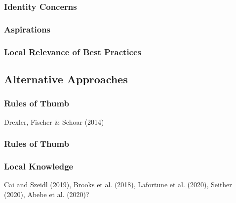 \documentclass[hideothersubsections, usenames,dvipsnames,10pt]{beamer}
\newenvironment{itemize_3pt}{\itemize\addtolength{\itemsep}{3pt}}{\enditemize}
\begin{document}
\begin{frame}
\frametitle{Identity Concerns}
	\begin{itemize_3pt}
	\item 
	\vspace{0.1in}
	\end{itemize_3pt}
\end{frame}

\begin{frame}
\frametitle{Aspirations}
	\begin{itemize_3pt}
	\item 
	\vspace{0.1in}
	\end{itemize_3pt}
\end{frame}

\begin{frame}
\frametitle{Local Relevance of Best Practices}
	\begin{itemize_3pt}
	\item 
	\vspace{0.1in}
	\end{itemize_3pt}
\end{frame}


\subsection{Alternative Approaches}

\begin{frame}
\frametitle{Rules of Thumb}
	\begin{itemize_3pt}
	\item Drexler, Fischer \& Schoar (2014)
	\vspace{0.1in}
	\end{itemize_3pt}
\end{frame}

\begin{frame}
\frametitle{Rules of Thumb}
	\begin{itemize_3pt}
	\item 
	\vspace{0.1in}
	\end{itemize_3pt}
\end{frame}


\begin{frame}
\frametitle{Local Knowledge}
	\begin{itemize_3pt}
	\item Cai and Szeidl (2019), Brooks et al. (2018), Lafortune et al. (2020), Seither (2020), Abebe et al. (2020)?
	\vspace{0.1in}
	\end{itemize_3pt}
\end{frame}
\end{document}
